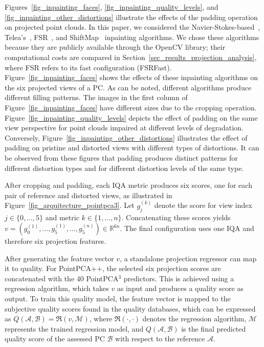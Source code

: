 \documentclass[final,3p,times,twocolumn]{elsarticle}
\begin{document}
Figures~\ref{fig_inpainting_faces}, \ref{fig_inpainting_quality_levels}, and \ref{fig_inpainting_other_distortions} illustrate the effects of the padding operation on projected point clouds. In this paper, we considered the Navier-Stokes-based~\cite{bertalmio2001navier}, Telea's~\cite{telea2004image}, \gls{FSR}~\cite{seiler2015resampling, genser2018signal}, and ShiftMap~\cite{shiftmap2012} inpainting algorithms. We chose these algorithms because they are publicly available through the OpenCV library; their computational costs are compared in Section~\ref{sec_results_projection_analysis}, where \gls{FSR} refers to its fast configuration (FSRFast).
Figure~\ref{fig_inpainting_faces} shows the effects of these inpainting algorithms on the six projected views of a \gls{PC}. As can be noted, different algorithms produce different filling patterns. The images in the first column of Figure~\ref{fig_inpainting_faces} have different sizes due to the cropping operation. Figure~\ref{fig_inpainting_quality_levels} depicts the effect of padding on the same view perspective for point clouds impaired at different levels of degradation. Conversely, Figure~\ref{fig_inpainting_other_distortions} illustrates the effect of padding on pristine and distorted views with different types of distortions. It can be observed from these figures that padding produces distinct patterns for different distortion types and for different distortion levels of the same type.


After cropping and padding, each \gls{IQA} metric produces six scores, one for each pair of reference and distorted views, as illustrated in Figure~\ref{fig_arquitecture_pointpca3}. Let $g_j^{(k)}$ denote the score for view index $j\in\{0,\ldots,5\}$ and metric $k\in\{1,\ldots,n\}$. Concatenating these scores yields $v=(g_0^{(1)},\ldots,g_5^{(1)},\ldots,g_5^{(n)})\in\mathbb{R}^{6n}$. The final configuration uses one IQA and therefore six projection features.

After generating the feature vector $v$, a standalone projection regressor can map it to quality. For PointPCA++, the selected six projection scores are concatenated with the 40 PointPCA$^3$ predictors. This is achieved using a regression algorithm, which takes $v$ as input and produces a quality score as output. To train this quality model, the feature vector is mapped to the subjective quality scores found in the quality databases, which can be expressed as $Q(\mathcal{A},\mathcal{B}) = \mathfrak{R}(v, \mathcal{M})$, where $\mathfrak{R}(\cdot,\cdot)$ denotes the regression algorithm, $\mathcal{M}$ represents the trained regression model, and $Q(\mathcal{A},\mathcal{B})$ is the final predicted quality score of the assessed \gls{PC} $\mathcal{B}$ with respect to the reference $\mathcal{A}$.
\end{document}
